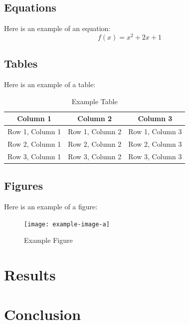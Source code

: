 \documentclass{IEEEtran}
\begin{document}
	\subsection{Equations}
	Here is an example of an equation:
	\begin{equation}
		f(x) = x^2 + 2x + 1
	\end{equation}
	
	\subsection{Tables}
	Here is an example of a table:
	\begin{table}[htbp]
		\centering
		\caption{Example Table}
		\label{tab:example}
		\begin{tabular}{|c|c|c|}
			\hline
			\textbf{Column 1} & \textbf{Column 2} & \textbf{Column 3} \\
			\hline
			Row 1, Column 1 & Row 1, Column 2 & Row 1, Column 3 \\
			\hline
			Row 2, Column 1 & Row 2, Column 2 & Row 2, Column 3 \\
			\hline
			Row 3, Column 1 & Row 3, Column 2 & Row 3, Column 3 \\
			\hline
		\end{tabular}
	\end{table}
	
	\subsection{Figures}
	Here is an example of a figure:
	\begin{figure}[htbp]
		\centering
		\texttt{[image: example-image-a]}
		\caption{Example Figure}
		\label{fig:example}
	\end{figure}
	
	\section{Results}
	
	\section{Conclusion}
	
	
    \printbibliography
	
\end{document}
